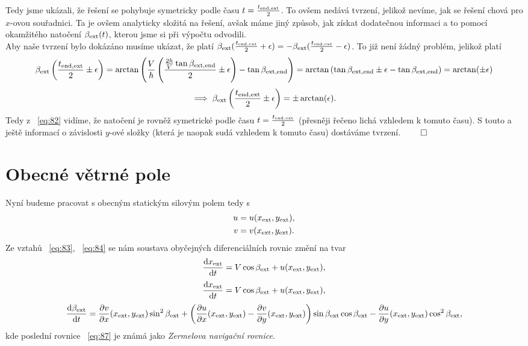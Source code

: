 \documentclass[reqno, a4paper]{amsart}
\begin{document}
Tedy jsme ukázali, že řešení se pohybuje symetricky podle času $t=\frac{ t_{\mathrm{end}, \mathrm{ext}}}{2}$. To ovšem nedává tvrzení, jelikož nevíme, jak se řešení chová pro $x$-ovou souřadnici. Ta je ovšem analyticky složitá na řešení, avšak máme jiný způsob, jak získat dodatečnou informaci a to pomocí okamžitého natočení $\beta_{\mathrm{ext}}(t)$, kterou jsme si při výpočtu odvodili.\\
Aby naše tvrzení bylo dokázáno musíme ukázat, že platí $\beta_{\mathrm{ext}}(\frac{ t_{\mathrm{end}, \mathrm{ext}}}{2}+\epsilon)=-\beta_{\mathrm{ext}}(\frac{ t_{\mathrm{end}, \mathrm{ext}}}{2}-\epsilon)$. To již není žádný problém, jelikož platí
\begin{equation*}
	\beta_{\mathrm{ext}}\left( \frac{ t_{\mathrm{end}, \mathrm{ext}}}{2}\pm\epsilon\right) =\arctan\left( \frac{V}{h}\left( \frac{ \frac{2h}{V}\tan\beta_{\mathrm{ext}, \mathrm{end}}}{2}\pm\epsilon\right) - \tan \beta_{\mathrm{ext}, \mathrm{end}}\right) 
	= \arctan\left( \tan \beta_{\mathrm{ext}, \mathrm{end}}\pm\epsilon - \tan \beta_{\mathrm{ext}, \mathrm{end}}\right)
	=\arctan(\pm\epsilon)
\end{equation*}
\begin{equation}
	\label{eq:82}
	\implies \beta_{\mathrm{ext}}\left( \frac{ t_{\mathrm{end}, \mathrm{ext}}}{2}\pm\epsilon\right) =\pm\arctan(\epsilon).
\end{equation}
Tedy z ~\eqref{eq:82} vidíme, že natočení je rovněž symetrické podle času $t=\frac{ t_{\mathrm{end}, \mathrm{ext}}}{2}$ (přesněji řečeno lichá vzhledem k tomuto času). S touto a ještě informací o závislosti $y$-ové složky (která je naopak sudá vzhledem k tomuto času) dostáváme tvrzení. $\qed$
\section{Obecné větrné pole}
Nyní budeme pracovat s obecným statickým silovým polem tedy s
\label{eq:56}
\begin{align}
	\label{eq:83}
	u &= u(x_{\mathrm{ext}},y_{\mathrm{ext}}), \\
	\label{eq:84}
	v &= v(x_{\mathrm{ext}},y_{\mathrm{ext}}).
\end{align}
Ze vztahů ~\eqref{eq:83}, ~\eqref{eq:84} se nám soustava obyčejných diferenciálních rovnic změní na tvar
\begin{equation}
	\label{eq:85}
	\frac{\mathrm{d} {x_{\mathrm{ext}}}}{\mathrm{d} {t}}=
	V \cos \beta_{\mathrm{ext}} + u(x_{\mathrm{ext}},y_{\mathrm{ext}}),
\end{equation}
\begin{equation}
	\label{eq:86}
	\frac{\mathrm{d} {x_{\mathrm{ext}}}}{\mathrm{d} {t}}
	=
	V \cos \beta_{\mathrm{ext}} + u(x_{\mathrm{ext}},y_{\mathrm{ext}}),
\end{equation}
\begin{equation}
	\label{eq:87}
	\frac{\mathrm{d} {\beta_{\mathrm{ext}}}}{\mathrm{d} {t}}
	=
	\frac{\partial v}{\partial x}(x_{\mathrm{ext}},y_{\mathrm{ext}})\sin^2 \beta_{\mathrm{ext}}+\left(\frac{\partial u}{\partial x}(x_{\mathrm{ext}},y_{\mathrm{ext}})-\frac{\partial v}{\partial y}(x_{\mathrm{ext}},y_{\mathrm{ext}})\right)\sin \beta_{\mathrm{ext}}\cos \beta_{\mathrm{ext}}-\frac{\partial u}{\partial y}(x_{\mathrm{ext}},y_{\mathrm{ext}})\cos^2 \beta_{\mathrm{ext}},
\end{equation}
kde poslední rovnice ~\eqref{eq:87} je známá jako \textit{Zermelova navigační rovnice}.
\end{document}
